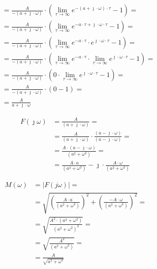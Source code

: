 \begin{task}
\begin{align*}
&=\frac{A}{-( a + \jmath \cdot \omega)} \cdot \left(\lim_{\tau \rightarrow \infty} e^{-( a + \jmath \cdot \omega) \cdot \tau} - 1\right)=\\
&=\frac{A}{-( a + \jmath \cdot \omega)} \cdot \left(\lim_{\tau \rightarrow \infty} e^{-a \cdot \tau + \jmath \cdot \omega \cdot \tau } - 1\right)=\\
&=\frac{A}{-( a + \jmath \cdot \omega)} \cdot \left(\lim_{\tau \rightarrow \infty} e^{-a \cdot \tau} \cdot e^{\jmath \cdot \omega \cdot \tau } - 1\right)=\\
&=\frac{A}{-( a + \jmath \cdot \omega)} \cdot \left(\lim_{\tau \rightarrow \infty} e^{-a \cdot \tau} \cdot \lim_{\tau \rightarrow \infty} e^{\jmath \cdot \omega \cdot \tau } - 1\right)=\\
&=\frac{A}{-( a + \jmath \cdot \omega)} \cdot \left(0 \cdot \lim_{\tau \rightarrow \infty} e^{\jmath \cdot \omega \cdot \tau } - 1\right)=\\
&=\frac{A}{-( a + \jmath \cdot \omega)} \cdot \left(0 - 1\right)=\\
&=\frac{A}{a + \jmath \cdot \omega}
\end{align*}



\begin{align*}
F(\jmath \omega )&=\frac{A}{( a + \jmath \cdot \omega)}=\\
&=\frac{A}{( a + \jmath \cdot \omega)} \cdot \frac{(a - \jmath \cdot \omega)}{(a - \jmath \cdot \omega)}=\\
&=\frac{A \cdot ( a - \jmath \cdot \omega)}{( a^2 + \omega^2)}=\\
&=\frac{A \cdot a}{( a^2 + \omega^2)} - \jmath \cdot \frac{A \cdot \omega}{( a^2 + \omega^2)}
\end{align*}


\begin{align*}
M(\omega)&=\left| F(j \omega) \right|=\\
&=\sqrt{\left(\frac{A \cdot a}{( a^2 + \omega^2)}\right)^2 + \left(\frac{-A \cdot \omega}{( a^2 + \omega^2)}\right)^2}=\\
&=\sqrt{\frac{A^2 \cdot (a^2+\omega^2)}{(a^2 + \omega^2)^2}}=\\
&=\sqrt{\frac{A^2}{(a^2 + \omega^2)}}=\\
&=\frac{A}{\sqrt{a^2 + \omega^2}}
\end{align*}


\end{task}

